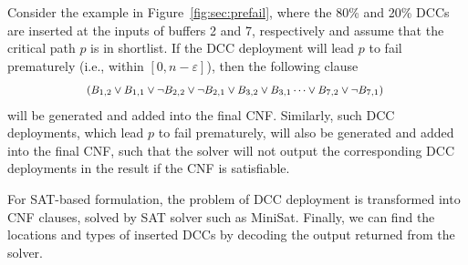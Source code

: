 Consider the example in Figure~\ref{fig:sec:prefail}, where the 80\% and 20\% DCCs are inserted at the inputs of buffers 2 and 7, respectively and assume that the critical path $p$ is in shortlist. If the DCC deployment will lead $p$ to fail prematurely (i.e., within $[ 0, n - \varepsilon]$), then the following clause
\begin{gather*}
	\fontsize{8}{8} \selectfont
	\mbox{($B_{1,2} \lor B_{1,1} \lor \neg B_{2,2} \lor \neg B_{2,1}  \lor B_{3,2} \lor B_{3,1} \dots \lor B_{7,2} \lor \neg B_{7,1}$) } 
\end{gather*}
will be generated and added into the final CNF. Similarly, such DCC deployments, which lead $p$ to fail prematurely, will also be generated and added into the final CNF, such that the solver will not output the corresponding DCC deployments in the result if the CNF is satisfiable. 

For SAT-based formulation, the problem of DCC deployment is transformed into CNF clauses, solved by SAT solver such as MiniSat. Finally, we can find the locations and types of inserted DCCs by decoding the output returned from the solver.



